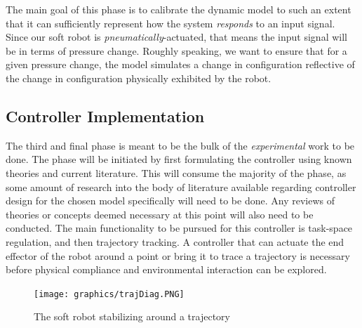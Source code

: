 The main goal of this phase is to calibrate the dynamic model to such an extent that it can sufficiently represent how the system \textit{responds} to an input signal. Since our soft robot is \textit{pneumatically}-actuated, that means the input signal will be in terms of pressure change. Roughly speaking, we want to ensure that for a given pressure change, the model simulates a change in configuration reflective of the change in configuration physically exhibited by the robot.   
\subsection{Controller Implementation}
The third and final phase is meant to be the bulk of the \textit{experimental} work to be done. The phase will be initiated by first formulating the controller using known theories and current literature. This will consume the majority of the phase, as some amount of research into the body of literature available regarding controller design for the chosen model specifically will need to be done. Any reviews of theories or concepts deemed necessary at this point will also need to be conducted. The main functionality to be pursued for this controller is task-space regulation, and then trajectory tracking. A controller that can actuate the end effector of the robot around a point or bring it to trace a trajectory is necessary before physical compliance and environmental interaction can be explored.

\begin{figure}[!ht]
    \centering
    \texttt{[image: graphics/trajDiag.PNG]}
    \caption{The soft robot stabilizing around a trajectory}
    \label{taskspace}
\end{figure}

